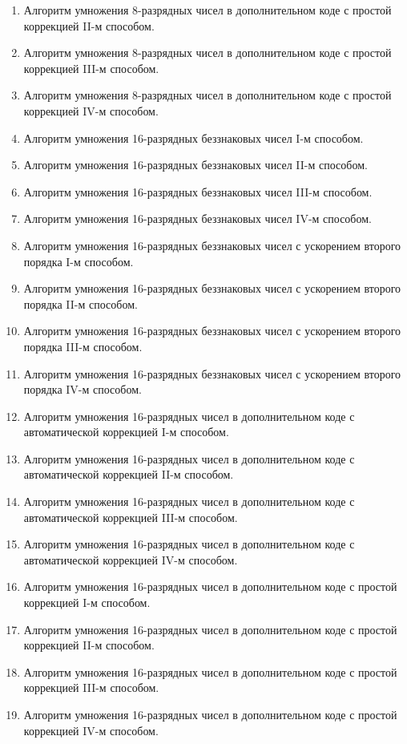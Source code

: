 \begin{enumerate}
    \item Алгоритм умножения 8-разрядных чисел в дополнительном коде с простой коррекцией II-м способом.
    \item Алгоритм умножения 8-разрядных чисел в дополнительном коде с простой коррекцией III-м способом.
    \item Алгоритм умножения 8-разрядных чисел в дополнительном коде с простой коррекцией IV-м способом.
    \item Алгоритм умножения 16-разрядных беззнаковых чисел I-м способом.
    \item Алгоритм умножения 16-разрядных беззнаковых чисел II-м способом.
    \item Алгоритм умножения 16-разрядных беззнаковых чисел III-м способом.
    \item Алгоритм умножения 16-разрядных беззнаковых чисел IV-м способом.
    \item Алгоритм умножения 16-разрядных беззнаковых чисел с ускорением второго порядка I-м способом.
    \item Алгоритм умножения 16-разрядных беззнаковых чисел с ускорением второго порядка II-м способом.
    \item Алгоритм умножения 16-разрядных беззнаковых чисел с ускорением второго порядка III-м способом.
    \item Алгоритм умножения 16-разрядных беззнаковых чисел с ускорением второго порядка IV-м способом.
    \item Алгоритм умножения 16-разрядных чисел в дополнительном коде с автоматической коррекцией I-м способом.
    \item Алгоритм умножения 16-разрядных чисел в дополнительном коде с автоматической коррекцией II-м способом.
    \item Алгоритм умножения 16-разрядных чисел в дополнительном коде с автоматической коррекцией III-м способом.
    \item Алгоритм умножения 16-разрядных чисел в дополнительном коде с автоматической коррекцией IV-м способом.
    \item Алгоритм умножения 16-разрядных чисел в дополнительном коде с простой коррекцией I-м способом.
    \item Алгоритм умножения 16-разрядных чисел в дополнительном коде с простой коррекцией II-м способом.
    \item Алгоритм умножения 16-разрядных чисел в дополнительном коде с простой коррекцией III-м способом.
    \item Алгоритм умножения 16-разрядных чисел в дополнительном коде с простой коррекцией IV-м способом.
\end{enumerate}

